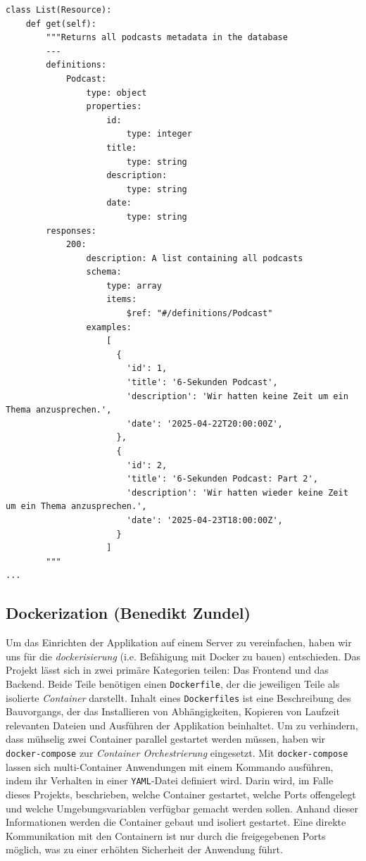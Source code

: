 \documentclass{article}
\begin{document}
\begin{lstlisting}[label=lst:listdoc, caption=Dokumentationskommentar des \texttt{/api/list} Endpunkts]
class List(Resource):
    def get(self):
        """Returns all podcasts metadata in the database
        ---
        definitions:
            Podcast:
                type: object
                properties:
                    id:
                        type: integer
                    title:
                        type: string
                    description:
                        type: string
                    date:
                        type: string
        responses:
            200:
                description: A list containing all podcasts
                schema:
                    type: array
                    items:
                        $ref: "#/definitions/Podcast"
                examples:
                    [
                      {
                        'id': 1,
                        'title': '6-Sekunden Podcast',
                        'description': 'Wir hatten keine Zeit um ein Thema anzusprechen.',
                        'date': '2025-04-22T20:00:00Z',
                      },
                      {
                        'id': 2,
                        'title': '6-Sekunden Podcast: Part 2',
                        'description': 'Wir hatten wieder keine Zeit um ein Thema anzusprechen.',
                        'date': '2025-04-23T18:00:00Z',
                      }
                    ]
        """
...
\end{lstlisting}

\subsection{Dockerization \small{(Benedikt Zundel)}}
Um das Einrichten der Applikation auf einem Server zu vereinfachen, haben wir uns für die \textit{dockerisierung} (i.e. Befähigung mit Docker zu bauen) entschieden. Das Projekt lässt sich in zwei primäre Kategorien teilen: Das Frontend und das Backend. Beide Teile benötigen einen \texttt{Dockerfile}, der die jeweiligen Teile als isolierte \textit{Container} darstellt. Inhalt eines \texttt{Dockerfiles} ist eine Beschreibung des Bauvorgangs, der das Installieren von Abhängigkeiten, Kopieren von Laufzeit relevanten Dateien und Ausführen der Applikation beinhaltet. Um zu verhindern, dass mühselig zwei Container parallel gestartet werden müssen, haben wir \texttt{docker-compose} zur \textit{Container Orchestrierung} eingesetzt. Mit \texttt{docker-compose} lassen sich multi-Container Anwendungen mit einem Kommando ausführen, indem ihr Verhalten in einer \texttt{YAML}-Datei definiert wird. Darin wird, im Falle dieses Projekts, beschrieben, welche Container gestartet, welche Ports offengelegt und welche Umgebungsvariablen verfügbar gemacht werden sollen. Anhand dieser Informationen werden die Container gebaut und isoliert gestartet. Eine direkte Kommunikation mit den Containern ist nur durch die freigegebenen Ports möglich, was zu einer erhöhten Sicherheit der Anwendung führt.
\end{document}
